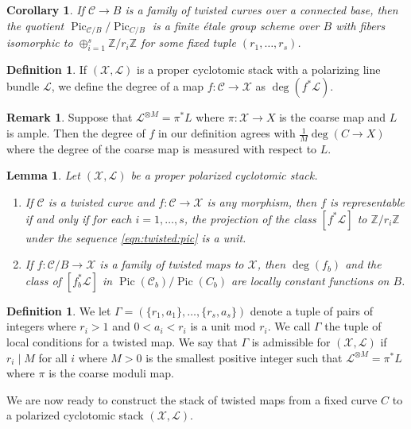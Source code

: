 \documentclass[a4paper,12pt]{amsart}
\newtheorem{lem}[thm]{Lemma}
\newtheorem{cor}[thm]{Corollary}
\theoremstyle{definition}
\newtheorem{defn}[thm]{Definition}
\newtheorem{rmk}[thm]{Remark}
\newcommand{\bZ}{\mathbb{Z}}
\newcommand{\cX}{\mathcal{X}}
\newcommand{\cC}{\mathcal{C}}
\newcommand{\cL}{\mathcal{L}}
\DeclareMathOperator{\Pic}{Pic}
\begin{document}
	\begin{cor}
		If $\cC \to B$ is a family of twisted curves over a connected base, then the quotient $\Pic_{\cC/B}/\Pic_{C/B}$ is a finite \'etale group scheme over $B$ with fibers isomorphic to $\oplus_{i = 1}^s \bZ/r_i\bZ$ for some fixed tuple $(r_1, \ldots, r_s)$.  
	\end{cor}
	
	\begin{defn}
		If $(\cX, \cL)$ is a proper cyclotomic stack with a polarizing line bundle $\cL$, we define the degree of a map $f : \cC \to \cX$ as $\deg (f^*\cL)$. 
	\end{defn}
	\begin{rmk}\label{rem:deg}
		Suppose that $\cL^{\otimes M} = \pi^*L$ where $\pi : \cX \to X$ is the coarse map and $L$ is ample. Then the degree of $f$ in our definition agrees with $\frac{1}{M}\deg(C \to X)$ where the degree of the coarse map is measured with respect to $L$. 
	\end{rmk}
	
	\begin{lem}\label{lemma:loc:const}
		Let $(\cX, \cL)$ be a proper polarized cyclotomic stack.
		\begin{enumerate}
			\item If $\cC$ is a twisted curve and $f : \cC \to \cX$ is any morphism, then $f$ is representable if and only if for each $i = 1, \ldots, s$, the projection of the class $[f^*\cL]$ to $\bZ/r_i\bZ$ under the sequence \ref{eqn:twisted:pic} is a unit. 
			\item If $f : \cC/B \to \cX$ is a family of twisted maps to $\cX$, then $\deg(f_b)$ and the class of $[f_b^*\cL]$ in $\Pic(\cC_b)/\Pic(C_b)$ are locally constant functions on $B$. 
		\end{enumerate}
	\end{lem}
	
	\begin{defn}\label{def:local-conditions} 
		We let $\Gamma = (\{r_1, a_1\}, \ldots, \{r_s, a_s\})$ denote a tuple of pairs of integers where $r_i > 1$ and $0 < a_i < r_i$ is a unit mod $r_i$. We call $\Gamma$ the tuple of local conditions for a twisted map. We say that $\Gamma$ is admissible for $(\cX, \cL)$ if $r_i \mid M$ for all $i$ where $M > 0$ is the smallest positive integer such that $\cL^{\otimes M} = \pi^*L$ where $\pi$ is the coarse moduli map. 
	\end{defn}
	
	We are now ready to construct the stack of twisted maps from a fixed curve $C$ to a polarized cyclotomic stack $(\cX,\cL)$.
	
\end{document}
